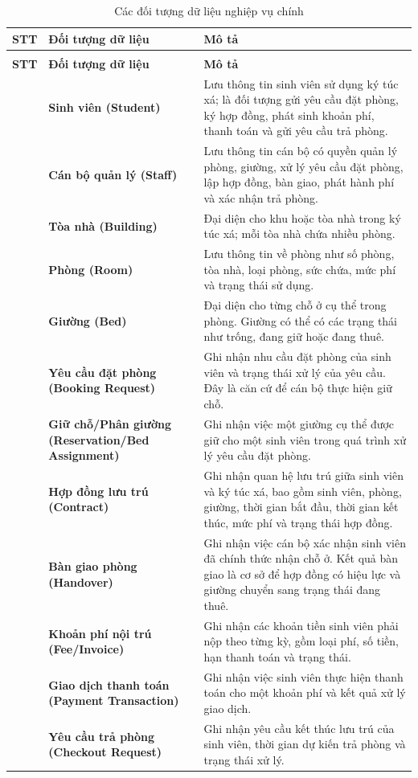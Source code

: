 \begin{xltabular}{\textwidth}{|>{\small\raggedright\arraybackslash}p{0.12\textwidth}|>{\small\raggedright\arraybackslash}p{0.30\textwidth}|>{\small\raggedright\arraybackslash}X|}
\caption{Các đối tượng dữ liệu nghiệp vụ chính}
\label{tab:ch2-1} \\
\hline
\textbf{STT} & \textbf{Đối tượng dữ liệu} & \textbf{Mô tả} \\
\hline
\endfirsthead
{} \\
\hline
\textbf{STT} & \textbf{Đối tượng dữ liệu} & \textbf{Mô tả} \\
\hline
{} & \textbf{Sinh viên (Student)} & Lưu thông tin sinh viên sử dụng ký túc xá; là đối tượng gửi yêu cầu đặt phòng, ký hợp đồng, phát sinh khoản phí, thanh toán và gửi yêu cầu trả phòng. \\
 & \textbf{Cán bộ quản lý (Staff)} & Lưu thông tin cán bộ có quyền quản lý phòng, giường, xử lý yêu cầu đặt phòng, lập hợp đồng, bàn giao, phát hành phí và xác nhận trả phòng. \\
 & \textbf{Tòa nhà (Building)} & Đại diện cho khu hoặc tòa nhà trong ký túc xá; mỗi tòa nhà chứa nhiều phòng. \\
 & \textbf{Phòng (Room)} & Lưu thông tin về phòng như số phòng, tòa nhà, loại phòng, sức chứa, mức phí và trạng thái sử dụng. \\
 & \textbf{Giường (Bed)} & Đại diện cho từng chỗ ở cụ thể trong phòng. Giường có thể có các trạng thái như trống, đang giữ hoặc đang thuê. \\
 & \textbf{Yêu cầu đặt phòng (Booking Request)} & Ghi nhận nhu cầu đặt phòng của sinh viên và trạng thái xử lý của yêu cầu. Đây là căn cứ để cán bộ thực hiện giữ chỗ. \\
 & \textbf{Giữ chỗ/Phân giường (Reservation/Bed Assignment)} & Ghi nhận việc một giường cụ thể được giữ cho một sinh viên trong quá trình xử lý yêu cầu đặt phòng. \\
 & \textbf{Hợp đồng lưu trú (Contract)} & Ghi nhận quan hệ lưu trú giữa sinh viên và ký túc xá, bao gồm sinh viên, phòng, giường, thời gian bắt đầu, thời gian kết thúc, mức phí và trạng thái hợp đồng. \\
 & \textbf{Bàn giao phòng (Handover)} & Ghi nhận việc cán bộ xác nhận sinh viên đã chính thức nhận chỗ ở. Kết quả bàn giao là cơ sở để hợp đồng có hiệu lực và giường chuyển sang trạng thái đang thuê. \\
 & \textbf{Khoản phí nội trú (Fee/Invoice)} & Ghi nhận các khoản tiền sinh viên phải nộp theo từng kỳ, gồm loại phí, số tiền, hạn thanh toán và trạng thái. \\
 & \textbf{Giao dịch thanh toán (Payment Transaction)} & Ghi nhận việc sinh viên thực hiện thanh toán cho một khoản phí và kết quả xử lý giao dịch. \\
 & \textbf{Yêu cầu trả phòng (Checkout Request)} & Ghi nhận yêu cầu kết thúc lưu trú của sinh viên, thời gian dự kiến trả phòng và trạng thái xử lý. \\
\hline
\end{xltabular}


